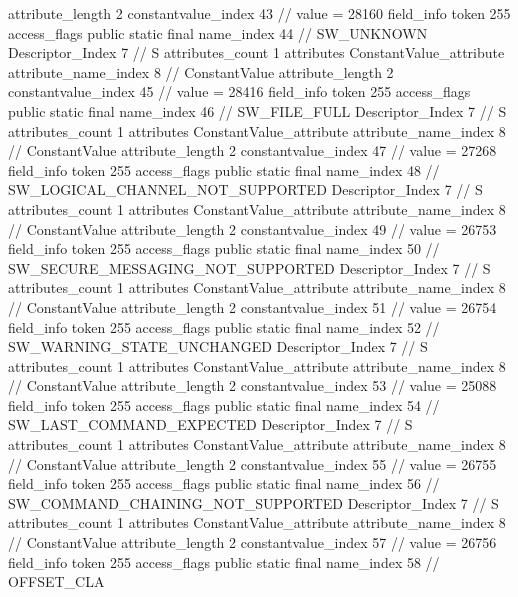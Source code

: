 {{{{{{{					attribute_length	2
					constantvalue_index	43		// value = 28160
				}
				}
			}
			field_info {
				token	255
				access_flags	public static final
				name_index	44		// SW_UNKNOWN
				Descriptor_Index	7		// S
				attributes_count	1
				attributes {
				ConstantValue_attribute {
					attribute_name_index	8		// ConstantValue
					attribute_length	2
					constantvalue_index	45		// value = 28416
				}
				}
			}
			field_info {
				token	255
				access_flags	public static final
				name_index	46		// SW_FILE_FULL
				Descriptor_Index	7		// S
				attributes_count	1
				attributes {
				ConstantValue_attribute {
					attribute_name_index	8		// ConstantValue
					attribute_length	2
					constantvalue_index	47		// value = 27268
				}
				}
			}
			field_info {
				token	255
				access_flags	public static final
				name_index	48		// SW_LOGICAL_CHANNEL_NOT_SUPPORTED
				Descriptor_Index	7		// S
				attributes_count	1
				attributes {
				ConstantValue_attribute {
					attribute_name_index	8		// ConstantValue
					attribute_length	2
					constantvalue_index	49		// value = 26753
				}
				}
			}
			field_info {
				token	255
				access_flags	public static final
				name_index	50		// SW_SECURE_MESSAGING_NOT_SUPPORTED
				Descriptor_Index	7		// S
				attributes_count	1
				attributes {
				ConstantValue_attribute {
					attribute_name_index	8		// ConstantValue
					attribute_length	2
					constantvalue_index	51		// value = 26754
				}
				}
			}
			field_info {
				token	255
				access_flags	public static final
				name_index	52		// SW_WARNING_STATE_UNCHANGED
				Descriptor_Index	7		// S
				attributes_count	1
				attributes {
				ConstantValue_attribute {
					attribute_name_index	8		// ConstantValue
					attribute_length	2
					constantvalue_index	53		// value = 25088
				}
				}
			}
			field_info {
				token	255
				access_flags	public static final
				name_index	54		// SW_LAST_COMMAND_EXPECTED
				Descriptor_Index	7		// S
				attributes_count	1
				attributes {
				ConstantValue_attribute {
					attribute_name_index	8		// ConstantValue
					attribute_length	2
					constantvalue_index	55		// value = 26755
				}
				}
			}
			field_info {
				token	255
				access_flags	public static final
				name_index	56		// SW_COMMAND_CHAINING_NOT_SUPPORTED
				Descriptor_Index	7		// S
				attributes_count	1
				attributes {
				ConstantValue_attribute {
					attribute_name_index	8		// ConstantValue
					attribute_length	2
					constantvalue_index	57		// value = 26756
				}
				}
			}
			field_info {
				token	255
				access_flags	public static final
				name_index	58		// OFFSET_CLA
}}}}}
